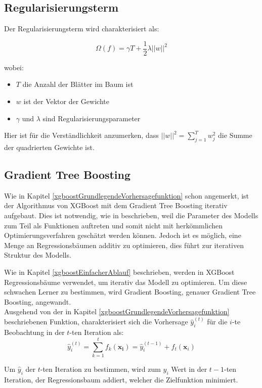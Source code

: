 \documentclass[12pt,titlepage,oneside]{book}
\begin{document}
\subsection{Regularisierungsterm}

Der Regularisierungsterm wird charakterisiert als:

\begin{equation}
\Omega(f) = \gamma T + \frac{1}{2}\lambda ||w||^2
\end{equation}

wobei:
\begin{itemize}
    \item $T$ die Anzahl der Blätter im Baum ist
    \item $w$ ist der Vektor der Gewichte
    \item $\gamma$ und $\lambda$ sind Regularisierungsparameter
\end{itemize}
Hier ist für die Verständlichkeit anzumerken, dass $||w||^2 = \sum_{j=1}^T w_j^2$ die Summe der quadrierten Gewichte ist.

\subsection{Gradient Tree Boosting}
Wie in Kapitel \ref{xgboostGrundlegendeVorhersagefunktion} schon angemerkt, ist der Algorithmus von XGBoost mit dem Gradient Tree Boosting iterativ aufgebaut. Dies ist notwendig, wie in \cite{chen2016xgboost} beschrieben, weil die Parameter des Modells zum Teil als Funktionen auftreten und somit nicht mit herkömmlichen Optimierungsverfahren geschätzt werden können. Jedoch ist es möglich, eine Menge an Regressionsbäumen additiv zu optimieren, dies führt zur iterativen Struktur des Modells.

Wie in Kapitel \ref{xgboostEinfacherAblauf} beschrieben, werden in XGBoost Regressionsbäume verwendet, um iterativ das Modell zu optimieren. Um diese schwachen Lerner zu bestimmen, wird Gradient Boosting, genauer Gradient Tree Boosting, angewandt.\\

Ausgehend von der in Kapitel \ref{xgboostGrundlegendeVorhersagefunktion} beschriebenen Funktion, charakterisiert sich die Vorhersage $\hat{y}_i^{(t)}$ für die $i$-te Beobachtung in der $t$-ten Iteration als:
\begin{equation}
\hat{y}_i^{(t)} = \sum_{k=1}^t f_k(\mathbf{x_i}) = \hat{y}_i^{(t-1)} + f_t(\mathbf{x}_i)
\end{equation}

Um $\hat{y}_i$ der $t$-ten Iteration zu bestimmen, wird zum $\hat{y}_i$ Wert in der $t-1$-ten Iteration, der Regressionsbaum addiert, welcher die Zielfunktion minimiert.\\
\end{document}
